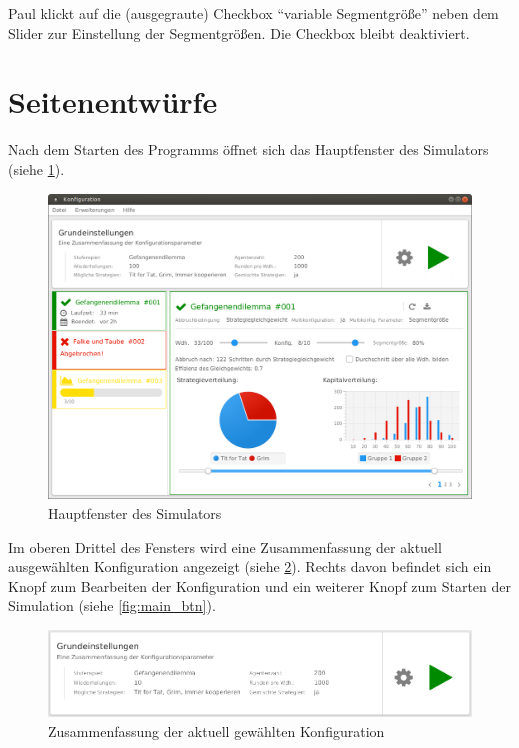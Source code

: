 \documentclass[parskip=full,11pt]{scrartcl}
\begin{document}
{Paul klickt auf die (ausgegraute) Checkbox \enquote{variable Segmentgröße} neben dem Slider zur Einstellung der Segmentgrößen.}
{Die Checkbox bleibt deaktiviert.}

\appendix
\newpage
\section{Seitenentwürfe}

Nach dem Starten des Programms öffnet sich das Hauptfenster des Simulators \\(siehe \cref{fig:home}).

\begin{figure}[hb]
	\includegraphics[width=\textwidth]{images/home.png}
	\caption{\label{fig:home}
		Hauptfenster des Simulators}
\end{figure}

Im oberen Drittel des Fensters wird eine Zusammenfassung der aktuell ausgewählten \Gls{Konfiguration} angezeigt (siehe \cref{fig:home_top}). Rechts davon befindet sich ein Knopf zum Bearbeiten der \Gls{Konfiguration} und ein weiterer Knopf zum Starten der Simulation (siehe \cref{fig:main_btn}).
 
\begin{figure}[hb]
	\centering
	\includegraphics[width=\textwidth]{images/home_top.png}
	\caption{\label{fig:home_top}
	Zusammenfassung der aktuell gewählten \Gls{Konfiguration}}
\end{figure} 
 
\end{document}
